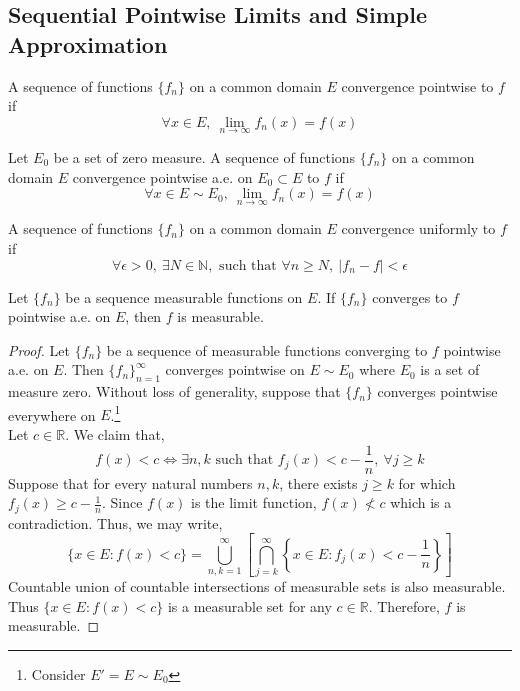 \subsection{Sequential Pointwise Limits and Simple Approximation}
\begin{definition}
	A sequence of functions $\{f_n\}$ on a common domain $E$ convergence pointwise to $f$ if 
	$$\forall x \in E,\ \lim_{n \to \infty} f_n(x) = f(x)$$
\end{definition}
\begin{definition}
	Let $E_0$ be a set of zero measure.
	A sequence of functions $\{f_n\}$ on a common domain $E$ convergence pointwise a.e. on $E_0 \subset E$ to $f$ if 
	$$\forall x \in E \sim E_0,\ \lim_{n \to \infty} f_n(x) = f(x)$$
\end{definition}
\begin{definition}
	A sequence of functions $\{f_n\}$ on a common domain $E$ convergence uniformly to $f$ if 
	$$\forall \epsilon > 0,\ \exists N \in \mathbb{N},\text{ such that } \forall n \ge N,\ |f_n-f| < \epsilon $$
\end{definition}

\begin{theorem}
	Let $\{ f_n \}$ be a sequence measurable functions on $E$.
	If $\{ f_n \}$ converges to $f$ pointwise a.e. on $E$, then $f$ is measurable.
\end{theorem}
\begin{proof}
	Let $\{ f_n \}$ be a sequence of measurable functions converging to $f$ pointwise a.e. on $E$.
	Then $\{ f_n\}_{n = 1}^\infty$	converges pointwise on $E \sim E_0$ where $E_0$ is a set of measure zero.
	Without loss of generality, suppose that $\{ f_n \}$ converges pointwise everywhere on $E$.\dag\footnote{
		Consider $E' = E \sim E_0$}\\

	Let $c \in \mathbb{R}$.
	We claim that,
	\begin{equation}
		f(x) < c \iff \exists n,k \text{ such that } f_j(x) < c-\frac{1}{n},\ \forall j \ge k
	\end{equation}
	Suppose that for every natural numbers $n,k$, there exists $j \ge k$ for which $f_j(x) \ge c - \frac{1}{n}$.
	Since $f(x)$ is the limit function, $f(x) \not< c$ which is a contradiction. 
	Thus, we may write,
	\begin{equation}
		\{ x \in E : f(x) < c \} = \bigcup_{n,k = 1}^\infty \left[ \bigcap_{j=k}^\infty \left\{ x \in E : f_j(x) < c-\frac{1}{n} \right\} \right] 
	\end{equation}
	Countable union of countable intersections of measurable sets is also measurable.
	Thus $\{ x \in E : f(x) < c \}$ is a measurable set for any $c \in \mathbb{R}$.
	Therefore, $f$ is measurable.
\end{proof}

